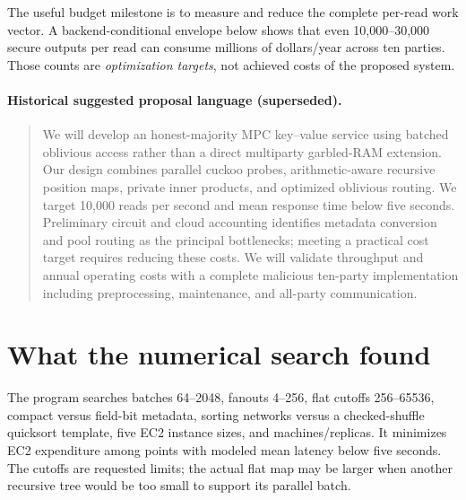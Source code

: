 \documentclass[11pt]{article}
\begin{document}
The useful budget milestone is to measure and reduce the complete per-read work
vector. A backend-conditional envelope below shows that even 10,000--30,000 secure
outputs per read can consume millions of dollars/year across ten parties. Those
counts are \emph{optimization targets}, not achieved costs of the proposed system.

\paragraph{Historical suggested proposal language (superseded).}
\begin{quote}
We will develop an honest-majority MPC key--value service using batched oblivious
access rather than a direct multiparty garbled-RAM extension. Our design combines
parallel cuckoo probes, arithmetic-aware recursive position maps, private inner
products, and optimized oblivious routing. We target 10,000 reads per second and
mean response time below five seconds. Preliminary circuit and cloud accounting
identifies metadata conversion and pool routing as the principal bottlenecks;
meeting a practical cost target requires reducing these costs. We will validate
throughput and annual operating costs with a complete malicious ten-party
implementation including preprocessing, maintenance, and all-party communication.
\end{quote}

\section{What the numerical search found}
The program searches batches 64--2048, fanouts 4--256, flat cutoffs 256--65536,
compact versus field-bit metadata, sorting networks versus a checked-shuffle
quicksort template, five EC2 instance sizes, and machines/replicas. It minimizes
EC2 expenditure among points with modeled mean latency below five seconds.
The cutoffs are requested limits; the actual flat map may be larger when another
recursive tree would be too small to support its parallel batch.
\end{document}
